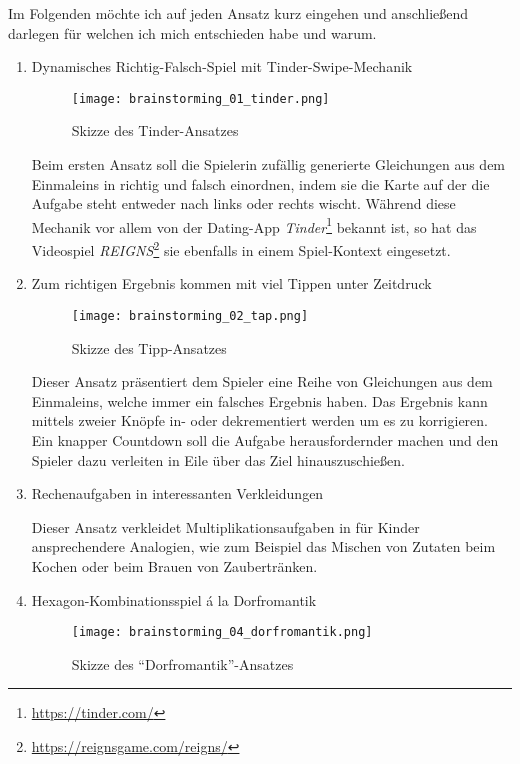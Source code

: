 Im Folgenden möchte ich auf jeden Ansatz kurz eingehen und anschließend darlegen für welchen ich mich entschieden habe und warum.

\begin{enumerate}
  \item Dynamisches Richtig-Falsch-Spiel mit Tinder-Swipe-Mechanik
  
  \begin{figure}[h]
    \centering
    \texttt{[image: brainstorming\_01\_tinder.png]}
    \caption{Skizze des Tinder-Ansatzes}
  \end{figure}

  Beim ersten Ansatz soll die Spielerin zufällig generierte Gleichungen aus dem Einmaleins in richtig und falsch einordnen, indem sie die Karte auf der die Aufgabe steht entweder nach links oder rechts wischt.
  Während diese Mechanik vor allem von der Dating-App \emph{Tinder}\footnote{\url{https://tinder.com/}} bekannt ist, so hat das Videospiel \emph{REIGNS}\footnote{\url{https://reignsgame.com/reigns/}} sie ebenfalls in einem Spiel-Kontext eingesetzt.

  \item Zum richtigen Ergebnis kommen mit viel Tippen unter Zeitdruck
  
  \begin{figure}[h]
    \centering
    \texttt{[image: brainstorming\_02\_tap.png]}
    \caption{Skizze des Tipp-Ansatzes}
  \end{figure}

  Dieser Ansatz präsentiert dem Spieler eine Reihe von Gleichungen aus dem Einmaleins, welche immer ein falsches Ergebnis haben.
  Das Ergebnis kann mittels zweier Knöpfe in- oder dekrementiert werden um es zu korrigieren.
  Ein knapper Countdown soll die Aufgabe herausfordernder machen und den Spieler dazu verleiten in Eile über das Ziel hinauszuschießen.

  \item Rechenaufgaben in interessanten Verkleidungen
  
  Dieser Ansatz verkleidet Multiplikationsaufgaben in für Kinder ansprechendere Analogien, wie zum Beispiel das Mischen von Zutaten beim Kochen oder beim Brauen von Zaubertränken.

  \item Hexagon-Kombinationsspiel á la Dorfromantik
  
  \begin{figure}[h]
    \centering
    \texttt{[image: brainstorming\_04\_dorfromantik.png]}
    \caption{Skizze des \enquote{Dorfromantik}-Ansatzes}
  \end{figure}


\end{enumerate}

